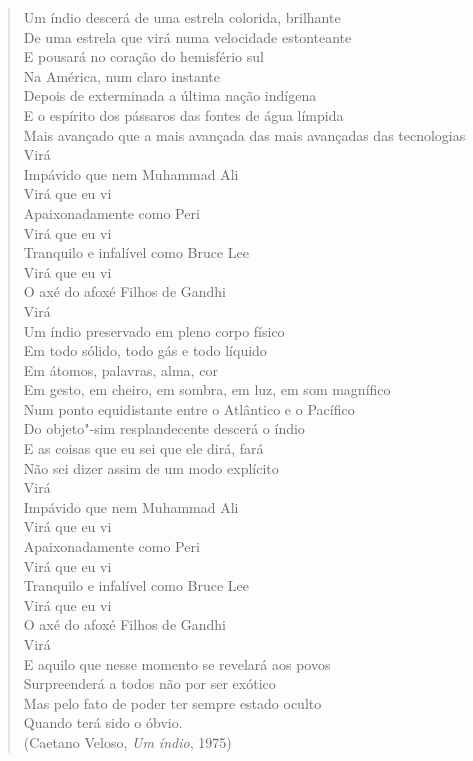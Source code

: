 \begin{verse}
Um índio descerá de uma estrela colorida, brilhante\\
De uma estrela que virá numa velocidade estonteante\\
E pousará no coração do hemisfério sul\\
Na América, num claro instante\\
Depois de exterminada a última nação indígena\\
E o espírito dos pássaros das fontes de água límpida\\
Mais avançado que a mais avançada das mais avançadas das tecnologias\\
Virá\\
Impávido que nem Muhammad Ali\\
Virá que eu vi\\
Apaixonadamente como Peri\\
Virá que eu vi\\
Tranquilo e infalível como Bruce Lee\\
Virá que eu vi\\
O axé do afoxé Filhos de Gandhi\\
Virá\\
Um índio preservado em pleno corpo físico\\
Em todo sólido, todo gás e todo líquido\\
Em átomos, palavras, alma, cor\\
Em gesto, em cheiro, em sombra, em luz, em som magnífico\\
Num ponto equidistante entre o Atlântico e o Pacífico\\
Do objeto"-sim resplandecente descerá o índio\\
E as coisas que eu sei que ele dirá, fará\\
Não sei dizer assim de um modo explícito\\
Virá\\
Impávido que nem Muhammad Ali\\
Virá que eu vi\\
Apaixonadamente como Peri\\
Virá que eu vi\\
Tranquilo e infalível como Bruce Lee\\
Virá que eu vi\\
O axé do afoxé Filhos de Gandhi\\
Virá\\
E aquilo que nesse momento se revelará aos povos\\
Surpreenderá a todos não por ser exótico\\
Mas pelo fato de poder ter sempre estado oculto\\
Quando terá sido o óbvio.\\
(Caetano Veloso, \emph{Um índio}, 1975)
\end{verse}

